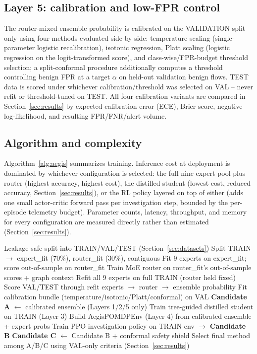 \documentclass[journal]{IEEEtran}
\begin{document}
\subsection{Layer 5: calibration and low-FPR control}
\label{sec:aegis_calib}
The router-mixed ensemble probability is calibrated on the VALIDATION split
only using four methods evaluated side by side: temperature scaling
(single-parameter logistic recalibration), isotonic regression, Platt
scaling (logistic regression on the logit-transformed score), and
class-wise/FPR-budget threshold selection; a split-conformal procedure
additionally computes a threshold controlling benign FPR at a target
$\alpha$ on held-out validation benign flows. TEST data is scored under
whichever calibration/threshold was selected on VAL -- never refit or
threshold-tuned on TEST. All four calibration variants are compared in
Section~\ref{sec:results} by expected calibration error (ECE), Brier score,
negative log-likelihood, and resulting FPR/FNR/alert volume.

\subsection{Algorithm and complexity}
Algorithm~\ref{alg:aegis} summarizes training. Inference cost at deployment
is dominated by whichever configuration is selected: the full nine-expert
pool plus router (highest accuracy, highest cost), the distilled student
(lowest cost, reduced accuracy, Section~\ref{sec:results}), or the RL policy
layered on top of either (adds one small actor-critic forward pass per
investigation step, bounded by the per-episode telemetry budget). Parameter
counts, latency, throughput, and memory for every configuration are measured
directly rather than estimated (Section~\ref{sec:results}).

\begin{algorithm}[t]
\caption{AegisGraph-X training (one dataset)}
\label{alg:aegis}
\begin{algorithmic}[1]
\State Leakage-safe split into TRAIN/VAL/TEST (Section~\ref{sec:datasets})
\State Split TRAIN $\to$ expert\_fit (70\%), router\_fit (30\%), contiguous
\State Fit 9 experts on expert\_fit; score out-of-sample on router\_fit
\State Train MoE router on router\_fit's out-of-sample scores + graph context
\State Refit all 9 experts on full TRAIN (router held fixed)
\State Score VAL/TEST through refit experts $\to$ router $\to$ ensemble probability
\State Fit calibration bundle (temperature/isotonic/Platt/conformal) on VAL
\State \textbf{Candidate A} $\gets$ calibrated ensemble (Layers 1/2/5 only)
\State Train tree-guided distilled student on TRAIN (Layer 3)
\State Build AegisPOMDPEnv (Layer 4) from calibrated ensemble + expert probs
\State Train PPO investigation policy on TRAIN env $\to$ \textbf{Candidate B}
\State \textbf{Candidate C} $\gets$ Candidate B + conformal safety shield
\State Select final method among A/B/C using VAL-only criteria (Section~\ref{sec:results})
\end{algorithmic}
\end{algorithm}
\end{document}
